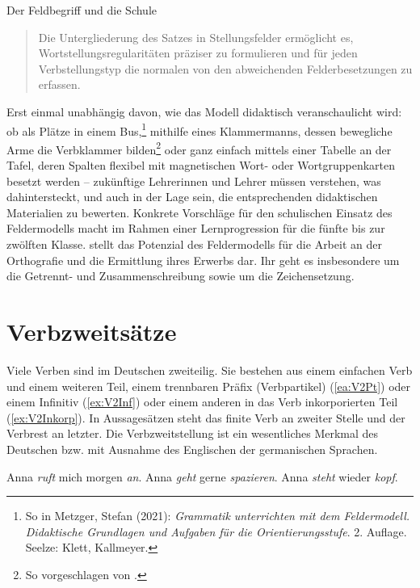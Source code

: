 \begin{Exkurs}{Der Feldbegriff und die Schule}
\begin{quote}
Die Untergliederung des Satzes in Stellungsfelder ermöglicht es, Wortstellungsregularitäten präziser zu formulieren und für jeden Verbstellungstyp die normalen von den abweichenden Felderbesetzungen zu erfassen. \citep[104]{Duerscheid2012} 
\end{quote}

Erst einmal unabhängig davon, wie das Modell didaktisch veranschaulicht wird: ob als Plätze in einem Bus,\footnote{So \zB in Metzger, Stefan (2021): \textit{Grammatik unterrichten mit dem Feldermodell. Didaktische Grundlagen und Aufgaben für die Orientierungsstufe}. 2. Auflage. Seelze: Klett, Kallmeyer.} mithilfe eines Klammermanns, dessen bewegliche Arme die Verbklammer bilden\footnote{So vorgeschlagen von \citet{Schoenenberg2011}.} oder ganz einfach mittels einer Tabelle an der Tafel, deren Spalten flexibel mit magnetischen Wort- oder Wortgruppenkarten besetzt werden -- zukünftige Lehrerinnen und Lehrer müssen verstehen, was dahintersteckt, und auch in der Lage sein, die entsprechenden didaktischen Materialien zu bewerten. Konkrete Vorschläge für den schulischen Einsatz des Feldermodells macht \citet[11]{Froemel2020} im Rahmen einer Lernprogression für die fünfte bis zur zwölften Klasse. \citet{Bredel2015TopOrth} stellt das Potenzial des Feldermodells für die Arbeit an der Orthografie und die Ermittlung ihres Erwerbs dar. Ihr geht es insbesondere um die Getrennt- und Zusammenschreibung sowie um die Zeichensetzung.

\end{Exkurs}



\section{Verbzweitsätze}\label{section:Verbzweitsätze}
\largerpage
Viele Verben sind im Deutschen zweiteilig. Sie bestehen aus einem einfachen Verb und einem weiteren Teil, \zB einem trennbaren Präfix (Verbpartikel) (\ref{ea:V2Pt}) oder einem Infinitiv (\ref{ex:V2Inf}) oder einem anderen in das Verb inkorporierten Teil (\ref{ex:V2Inkorp}). In Aussagesätzen steht das finite Verb an zweiter Stelle und der Verbrest an letzter. Die Verbzweitstellung ist ein wesentliches Merkmal des Deutschen bzw. mit Ausnahme des Englischen der germanischen Sprachen.

\ea
\ea \label{ea:V2Pt} Anna \textit{ruft} mich morgen \textit{an}.
\ex \label{ex:V2Inf} Anna \textit{geht} gerne \textit{spazieren}.
\ex \label{ex:V2Inkorp} Anna \textit{steht} wieder \textit{kopf}. 
\z 
\z 

